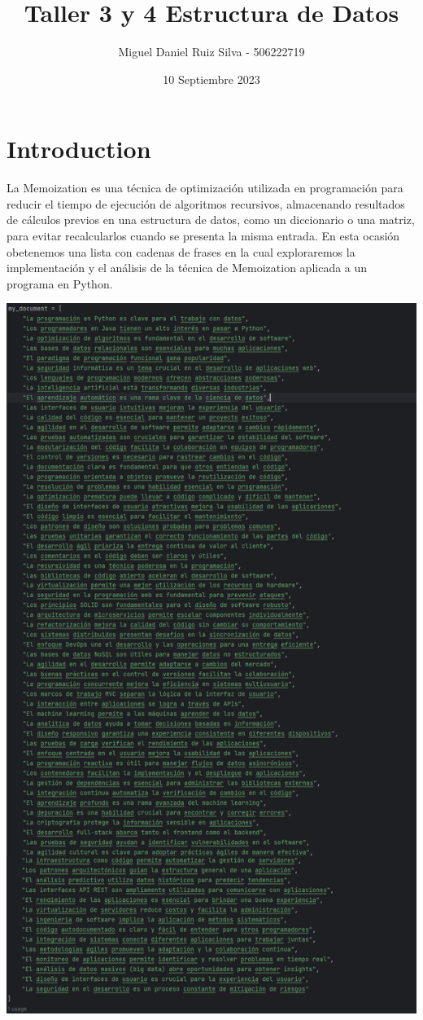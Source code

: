 \documentclass[a4paper,twocolumn,10pt]{article}
\title{Taller 3 y 4 Estructura de Datos}
\author{Miguel Daniel Ruiz Silva - 506222719 }
\date{10 Septiembre 2023}
\begin{document}
\maketitle

\section{Introduction}
La Memoization es una técnica de optimización utilizada en programación para reducir el tiempo de ejecución de algoritmos recursivos, almacenando resultados de cálculos previos en una estructura de datos, como un diccionario o una matriz, para evitar recalcularlos cuando se presenta la misma entrada. En esta ocasión obetenemos una lista con cadenas de frases en la cual exploraremos la implementación y el análisis de la técnica de Memoization aplicada a un programa en Python.

\includegraphics[width=0.8\linewidth]{images/my_document.png}
\end{document}
